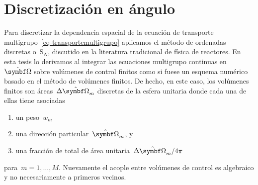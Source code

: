 \documentclass[
  12pt,
  a4paper,
  table]{scrbook}
\providecommand{\tightlist}{%
  \setlength{\itemsep}{0pt}\setlength{\parskip}{0pt}}\usepackage{longtable,booktabs,array}
\theoremstyle{plain}
\theoremstyle{definition}
\theoremstyle{plain}
\theoremstyle{plain}
\theoremstyle{remark}
\begin{document}
\hypertarget{sec-sn}{%
\section{Discretización en ángulo}\label{sec-sn}}

Para discretizar la dependencia espacial de la ecuación de transporte
multigrupo~\ref{eq-transportemultigrupo} aplicamos el método de
ordenadas discretas o~S\(_N\), discutido en la literatura tradicional de
física de reactores. En esta tesis lo derivamos al integrar las
ecuaciones multigrupo continuas en~\(\omegaversor\) sobre volúmenes de
control finitos como si fuese un esquema numérico basado en el método de
volúmenes finitos. De hecho, en este caso, los volúmenes finitos son
áreas~\(\Delta \omegaversor_m\) discretas de la esfera unitaria donde
cada una de ellas tiene asociadas

\begin{enumerate}
\def\labelenumi{\arabic{enumi}.}
\tightlist
\item
  un peso~\(w_m\)
\item
  una dirección particular~\(\omegaversor_m\), y
\item
  una fracción de total de área unitaria~\(\Delta \omegaversor_m/4\pi\)
\end{enumerate}

para~\(m=1,\dots,M\). Nuevamente el acople entre volúmenes de control es
algebraico y no necesariamente a primeros vecinos.
\end{document}
